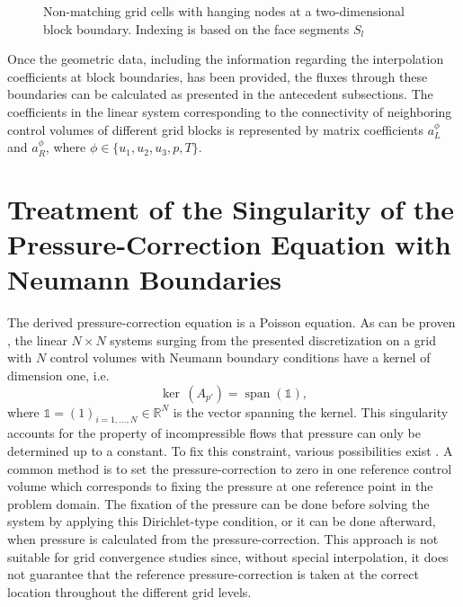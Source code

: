\begin{figure}
  \centering
  
  \caption{Non-matching grid cells with hanging nodes at a two-dimensional block boundary. Indexing is based on the face segments $S_l$}
  \label{fig:nonmatching}
\end{figure}

Once the geometric data, including the information regarding the interpolation coefficients at block boundaries, has been provided, the fluxes through these boundaries can be calculated as presented in the antecedent subsections. The coefficients in the linear system corresponding to the connectivity of neighboring control volumes of different grid blocks is represented by matrix coefficients \(a_L^{\phi}\) and \(a_R^{\phi}\), where \(\phi \in \{u_1,u_2,u_3,p,T\}\).

\section{Treatment of the Singularity of the Pressure-Correction Equation with Neumann Boundaries}
\label{sec:singularitytreatment}

The derived pressure-correction equation is a Poisson equation. As can be proven \cite{hackbusch96}, the linear \(N \times N\) systems surging from the presented discretization on a grid with \(N\) control volumes with Neumann boundary conditions have a kernel of dimension one, i.e.
\begin{displaymath}
  \operatorname{ker}\,(A_{p'}) = \operatorname{span}(\mathbb{1}),
\end{displaymath}
where \(\mathbb{1} = (1)_{i = 1,\dots,N} \in \mathbb{R}^N\) is the vector spanning the kernel. This singularity accounts for the property of incompressible flows that pressure can only be determined up to a constant. To fix this constraint, various possibilities exist \cite{ferziger02}. A common method is to set the pressure-correction to zero in one reference control volume which corresponds to fixing the pressure at one reference point in the problem domain. The fixation of the pressure can be done before solving the system by applying this Dirichlet-type condition, or it can be done afterward, when pressure is calculated from the pressure-correction. This approach is not suitable for grid convergence studies since, without special interpolation, it does not guarantee that the reference pressure-correction is taken at the correct location throughout the different grid levels.

